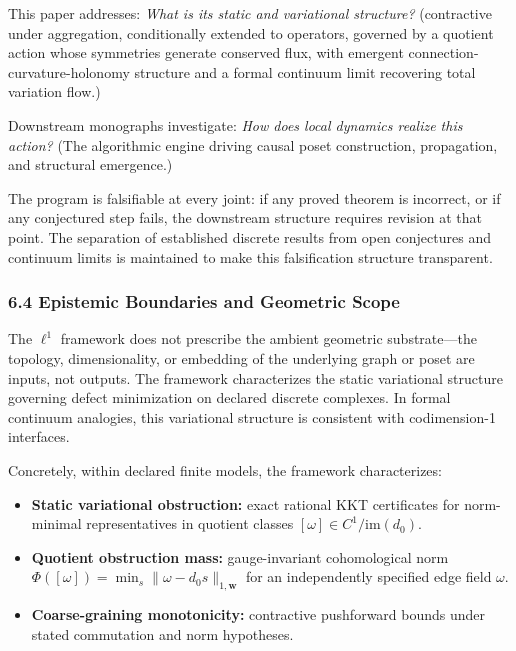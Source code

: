 \documentclass[
]{article}
\providecommand{\tightlist}{%
  \setlength{\itemsep}{0pt}\setlength{\parskip}{0pt}}
\providecommand{\tightlist}{%
  \setlength{\itemsep}{0pt}\setlength{\parskip}{0pt}}
\begin{document}
This paper addresses: \emph{What is its static and variational structure?} (contractive under aggregation, conditionally extended to operators, governed by a quotient action whose symmetries generate conserved flux, with emergent connection-curvature-holonomy structure and a formal continuum limit recovering total variation flow.)

Downstream monographs investigate: \emph{How does local dynamics realize this action?} (The algorithmic engine driving causal poset construction, propagation, and structural emergence.)

The program is falsifiable at every joint: if any proved theorem is incorrect, or if any conjectured step fails, the downstream structure requires revision at that point. The separation of established discrete results from open conjectures and continuum limits is maintained to make this falsification structure transparent.

\subsubsection{6.4 Epistemic Boundaries and Geometric Scope}\label{epistemic-boundaries-and-geometric-scope}

The \(\ell^1\) framework does not prescribe the ambient geometric substrate---the topology, dimensionality, or embedding of the underlying graph or poset are inputs, not outputs. The framework characterizes the static variational structure governing defect minimization on declared discrete complexes. In formal continuum analogies, this variational structure is consistent with codimension-1 interfaces.

Concretely, within declared finite models, the framework characterizes:

\begin{itemize}
\tightlist
\item
  \textbf{Static variational obstruction:} exact rational KKT certificates for norm-minimal representatives in quotient classes \([\omega] \in C^1 / \mathrm{im}(d_0)\).
\item
  \textbf{Quotient obstruction mass:} gauge-invariant cohomological norm \(\Phi([\omega]) = \min_{s} \|\omega - d_0 s\|_{1,\mathbf{w}}\) for an independently specified edge field \(\omega\).
\item
  \textbf{Coarse-graining monotonicity:} contractive pushforward bounds under stated commutation and norm hypotheses.
\end{itemize}
\end{document}
